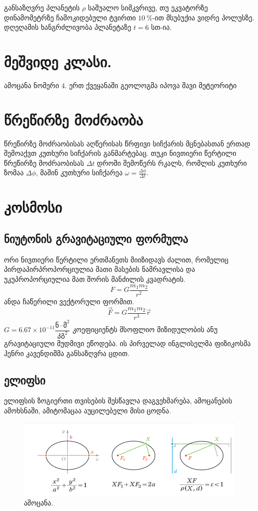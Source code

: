 \documentclass{book}
\begin{document}
განსაზღვრე პლანეტის $\rho$ საშუალო სიმკვრივე, თუ ეკვატორზე დინამომეტრზე ჩამოკიდებული ტვირთი $10~\%$-ით მსუბუქია ვიდრე პოლუსზე. დღეღამის ხანგრძლივობა პლანეტაზე $t = 6$ სთ-ია.

\section{მეშვიდე კლასი.}
ამოცანა ნომერი 4. ერთ ქვეყანაში გეოლოგმა იპოვა შავი მეტეორიტი
	 
\section{წრეწირზე მოძრაობა}
წრეწირზე მოძრაობისას აღწერისას წრფივი სიჩქარის მცნებასთან ერთად შემოაქვთ კუთხური სიჩქარის განმარტებაც. თუკი ნივთიერი წერტილი წრეწირზე მოძრაობისას $\Delta t$ დროში შემოწერს რკალს, რომლის კუთხური ზომაა $\Delta \phi$, მაშინ კუთხური სიჩქარეა $\omega = \frac{\Delta \phi}{\Delta t}$.

\section{კოსმოსი}
\subsection{ნიუტონის გრავიტაციული ფორმულა}
ორი ნივთიერი წერტილი ერთმანეთს მიიზიდავს ძალით, რომელიც პირდაპირპროპორციულია მათი მასების ნამრავლისა და უკუპროპორციულია მათ შორის მანძილის კვადრატის.
	\begin{equation}
		F = G\frac{m_1 m_2}{r^2}
	\end{equation}
ანდა ჩაწერილი ვექტორული ფორმით.
	\begin{equation}
		\vec{F} = G\frac{m_1 m_2}{r^3}\vec{r}
	\end{equation}
$G = 6.67 \times 10^{-11} \dfrac{\text{ნ}\cdot\text{მ}^2}{\text{კგ}^2}$ კოეფიციენტს მსოფლიო მიზიდულობის ანუ გრავიტაციული მუდმივი ეწოდება.
ის პირველად ინგლისელმა ფიზიკოსმა ჰენრი კავენდიშმა განსაზღვრა ცდით.

\subsection{ელიფსი}%
ელიფსის ზოგიერთი თვისების შესწავლა დაგვეხმარება, ამოცანების ამოხსნაში, ამიტომაცაა აუცილებელი მისი ცოდნა.
	\begin{figure}[H]
	\centering
    \includegraphics[width=0.9\columnwidth]{figures/ellipse}
    \caption{ამოცანა.}
    \label{fig:statics_1}
    \end{figure}
\end{document}

